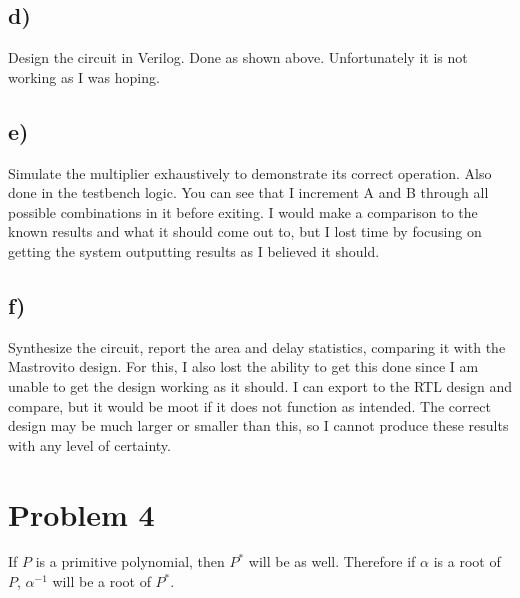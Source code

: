 \documentclass[a4paper,11pt]{exam}
\begin{document}
\subsection{d)}
\label{sec:org2ef8f2a}
 Design the circuit in Verilog.\newline\newline
Done as shown above. Unfortunately it is not working as I was hoping. 
\subsection{e)}
\label{sec:org2d04b26}
Simulate the multiplier exhaustively to demonstrate its correct operation.\newline\newline
Also done in the testbench logic. You can see that I increment A and B through all possible combinations in it before exiting. I would make a comparison to the known results and what it should come out to, but I lost time by focusing on getting the system outputting results as I believed it should. 
\subsection{f)}
\label{sec:orgf0fafa7}
Synthesize the circuit, report the area and delay statistics, comparing it with the Mastrovito
design.\newline\newline
For this, I also lost the ability to get this done since I am unable to get the design working as it should. I can export to the RTL design and compare, but it would be moot if it does not function as intended. The correct design may be much larger or smaller than this, so I cannot produce these results with any level of certainty. 

\section{Problem 4}
\label{sec:org1e42899}
If \(P\) is a primitive polynomial, then \(P^*\) will be as well. Therefore if \(\alpha\) is a root of \(P\), \(\alpha^{-1}\) will be a root of \(P^*\).
\end{document}
